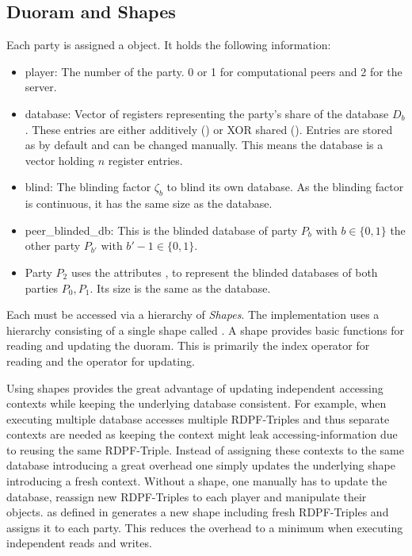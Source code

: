 \subsection*{Duoram and Shapes} \label{subsub:implementationDuoram}
Each party is assigned a  object.
It holds the following information: 
\begin{itemize}
    \item player: 
    The number of the party.
    0 or 1 for computational peers and 2 for the server.
    \item database: 
    Vector of registers representing the party's share of the database $D_b$.
    These entries are either additively () or XOR shared ().
    Entries are stored as  by default and can be changed manually.
    This means the database is a vector holding $n$ register entries.
    \item blind: 
    The blinding factor $\zeta_b$ to blind its own database.
    As the blinding factor is continuous, it has the same size as the database.
    \item {peer\_blinded\_db}:
    This is the blinded database of party $P_b\text{ with }b\in\{0,1\}$ the other party $P_{b'}\text{ with }{b'-1}\in\{0,1\}$.
    \item Party $P_2$ uses the attributes ,  to represent the blinded databases of both parties $P_0,P_1$.
    Its size is the same as the database.
\end{itemize}

Each  must be accessed via a hierarchy of \textit{Shapes}.
The implementation uses a hierarchy consisting of a single shape called .
A shape provides basic functions for reading and updating the duoram.
This is primarily the index operator \code{[]} for reading and the \code{+=} operator for updating.

Using shapes provides the great advantage of updating independent accessing contexts while keeping the underlying database consistent.
For example, when executing multiple database accesses multiple RDPF-Triples and thus separate contexts are needed as keeping the context might leak accessing-information due to reusing the same RDPF-Triple.
Instead of assigning these contexts to the same database introducing a great overhead one simply updates the underlying shape introducing a fresh context.
Without a shape, one manually has to update the database, reassign new RDPF-Triples to each player and manipulate their  objects.
 as defined in  generates a new shape including fresh RDPF-Triples and assigns it to each party.
This reduces the overhead to a minimum when executing independent reads and writes.


